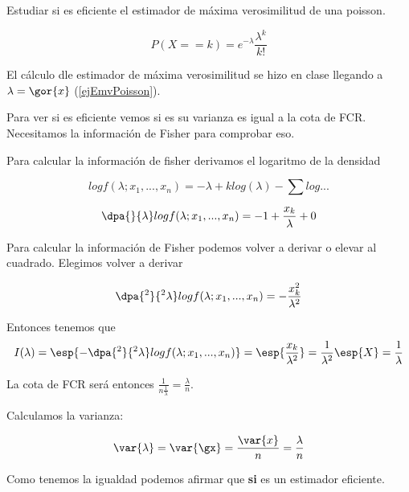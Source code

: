 \begin{problem}[4]
Estudiar si es eficiente el estimador de máxima verosimilitud de una poisson.
\solution


\[P(X==k) = e^{-\lambda} \frac{\lambda^{k}}{k!}\]

El cálculo dle estimador de máxima verosimilitud se hizo en clase llegando a $\lambda = \gor{x}$ (\ref{ejEmvPoisson}).

Para ver si es eficiente vemos si es su varianza es igual a la cota de FCR. Necesitamos la información de Fisher para comprobar eso.

Para calcular la información de fisher derivamos el logaritmo de la densidad

\[log f(\lambda;x_1,...,x_n) = -\lambda + k log(\lambda) - \sum log...\]

\[\dpa{}{\lambda} log f (\lambda;x_1,...,x_n) = - 1 + \frac{x_k}{\lambda} + 0\]

Para calcular la información de Fisher podemos volver a derivar o elevar al cuadrado. Elegimos volver a derivar

\[\dpa{^2}{^2\lambda} log f (\lambda;x_1,...,x_n) = -\frac{x_k^2}{\lambda^2}\]

Entonces tenemos que \[I(\lambda) = \esp{-\dpa{^2}{^2\lambda} log f (\lambda;x_1,...,x_n)} = \esp{\frac{x_k}{\lambda^2}} = \frac{1}{\lambda^2}\esp{X} = \frac{1}{\lambda}\]

La cota de FCR será entonces $\displaystyle\frac{1}{n\frac{1}{\lambda}} = \frac{\lambda}{n}$.

Calculamos la varianza:

\[\var{\lambda} = \var{\gx} = \frac{\var{x}}{n} = \frac{\lambda}{n}\]

Como tenemos la igualdad podemos afirmar que \textbf{si} es un estimador eficiente.
\end{problem}

